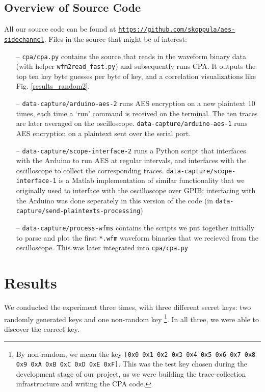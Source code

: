 \documentclass[journal]{ieee_style}
\begin{document}
\subsection{Overview of Source Code}
All our source code can be found at \texttt{\url{https://github.com/skoppula/aes-sidechannel}}. Files in the source that might be of interest:
\begin{itemize}
    \item[--] \texttt{cpa/cpa.py} contains the source that reads in the waveform binary data (with helper \texttt{wfm2read\_fast.py}) and subsequently runs CPA. It outputs the top ten key byte guesses per byte of key, and a correlation visualizations like Fig. \ref{results_random2}.
    \item[--] \texttt{data-capture/arduino-aes-2} runs AES encryption on a new plaintext 10 times, each time a `run' command is received on the terminal. The ten traces are later averaged on the oscilloscope. \texttt{data-capture/arduino-aes-1} runs AES encryption on a plaintext sent over the serial port.
    \item[--] \texttt{data-capture/scope-interface-2} runs a Python script that interfaces with the Arduino to run AES at regular intervals, and interfaces with the oscilloscope to collect the corresponding traces. \texttt{data-capture/scope-interface-1} is a Matlab implementation of similar functionality that we originally used to interface with the oscilloscope over GPIB; interfacing with the Arduino was done seperately in this version of the code (in \texttt{data-capture/send-plaintexts-processing})
    \item[--] \texttt{data-capture/process-wfms} contains the scripts we put together initially to parse and plot the first \texttt{*.wfm} waveform binaries that we recieved from the oscilloscope. This was later integrated into \texttt{cpa/cpa.py}
\end{itemize}

\section{Results}
We conducted the experiment three times, with three different secret keys: two randomly generated keys and one non-random key \footnote{By non-random, we mean the key \texttt{[0x0 0x1 0x2 0x3 0x4 0x5 0x6 0x7 0x8 0x9 0xA 0xB 0xC 0xD 0xE 0xF]}. This was the test key chosen during the development stage of our project, as we were building the trace-collection infrastructure and writing the CPA code.}. In all three, we were able to discover the correct key.
\end{document}
